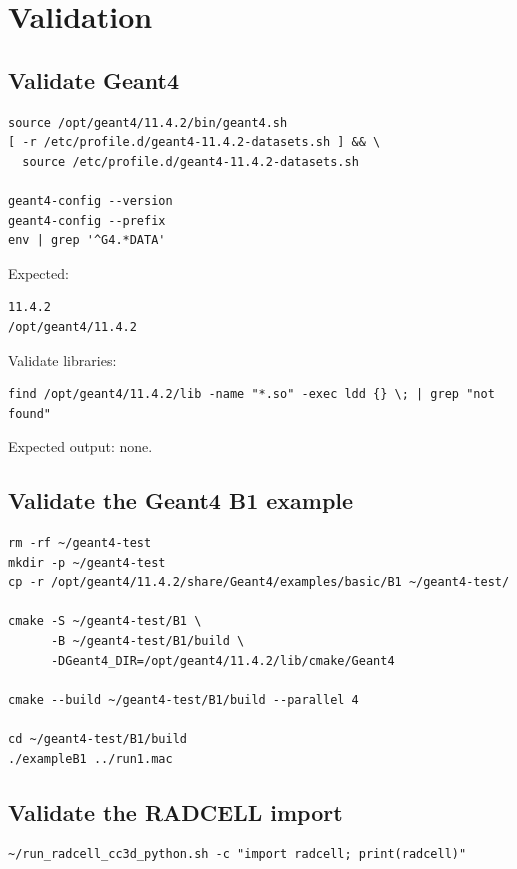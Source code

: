 \documentclass[11pt,a4paper,twoside,pdftex]{refrep}
\begin{document}
\chapter{Validation}

\section{Validate Geant4}

\begin{lstlisting}
source /opt/geant4/11.4.2/bin/geant4.sh
[ -r /etc/profile.d/geant4-11.4.2-datasets.sh ] && \
  source /etc/profile.d/geant4-11.4.2-datasets.sh

geant4-config --version
geant4-config --prefix
env | grep '^G4.*DATA'
\end{lstlisting}

Expected:

\begin{lstlisting}
11.4.2
/opt/geant4/11.4.2
\end{lstlisting}

Validate libraries:

\begin{lstlisting}
find /opt/geant4/11.4.2/lib -name "*.so" -exec ldd {} \; | grep "not found"
\end{lstlisting}

Expected output: none.

\section{Validate the Geant4 B1 example}

\begin{lstlisting}
rm -rf ~/geant4-test
mkdir -p ~/geant4-test
cp -r /opt/geant4/11.4.2/share/Geant4/examples/basic/B1 ~/geant4-test/

cmake -S ~/geant4-test/B1 \
      -B ~/geant4-test/B1/build \
      -DGeant4_DIR=/opt/geant4/11.4.2/lib/cmake/Geant4

cmake --build ~/geant4-test/B1/build --parallel 4

cd ~/geant4-test/B1/build
./exampleB1 ../run1.mac
\end{lstlisting}

\section{Validate the RADCELL import}

\begin{lstlisting}
~/run_radcell_cc3d_python.sh -c "import radcell; print(radcell)"
\end{lstlisting}
\end{document}
